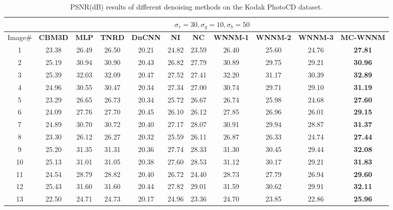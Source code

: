 \documentclass[10pt,onecolumn,letterpaper]{article}
\begin{document}
\begin{table}
\caption{PSNR(dB) results of different denoising methods on the Kodak PhotoCD dataset.}
\label{t2}
\begin{center}
\renewcommand\arraystretch{1.0}
\footnotesize
\begin{tabular}{|c||c|c|c|c|c|c|c|c|c|c|}
\hline
&\multicolumn{10}{c|}{ $\sigma_{r} = 30, \sigma_{g} = 10, \sigma_{b} = 50$}
\\
\hline
\hline
Image\#
&
\textbf{CBM3D} \cite{cbm3d}
&
\textbf{MLP} \cite{mlp}
&
\textbf{TNRD} \cite{chen2015learning}
&
\textbf{DnCNN} \cite{dncnn}
&
\textbf{NI} \cite{neatimage}
&
\textbf{NC} \cite{noiseclinic}
&
\textbf{WNNM-1} \cite{wnnm}
&
\textbf{WNNM-2}
&
\textbf{WNNM-3}
&
\textbf{MC-WNNM}
\\
\hline
1& 23.38 & 26.49 & 26.50 & 20.21 & 24.82 & 23.59 & 26.40 & 25.60 & 24.76 & \textbf{27.81}
\\
\hline
2& 25.19 & 30.94 & 30.90 & 20.43 & 26.82 & 27.79 & 30.89 & 29.75 & 29.21 & \textbf{30.96}
\\
\hline
3& 25.39 & 32.03 & 32.09 & 20.47 & 27.52 & 27.41 & 32.20 & 31.17 & 30.39 & \textbf{32.89}
\\
\hline 
4& 24.96 & 30.55 & 30.47 & 20.34 & 27.34 & 27.00 & 30.74 & 29.71 & 29.10 & \textbf{31.19} 
\\
\hline
5& 23.29 & 26.65 & 26.73 & 20.34 & 25.72 & 26.67 & 26.74 & 25.98 & 24.68 & \textbf{27.60}
\\
\hline
6& 24.09 & 27.76 & 27.70 & 20.45 & 26.10 & 26.12 & 27.85 & 26.96 & 26.01 & \textbf{29.15}
\\
\hline
7& 24.89 & 30.70 & 30.72 & 20.40 & 27.17 & 28.07 & 30.91 & 29.94 & 28.87 & \textbf{31.37} 
\\
\hline
8& 23.30 & 26.12 & 26.27 & 20.32 & 25.59 & 26.11 & 26.87 & 26.33 & 24.74 & \textbf{27.44}
\\
\hline
9& 25.20 & 31.35 & 31.31 & 20.36 & 27.74 & 28.33 & 31.30 & 30.45 & 29.44 & \textbf{32.08}
\\
\hline
10& 25.13 & 31.01 & 31.05 & 20.38 & 27.60 & 28.53 & 31.12 & 30.17 & 29.21 & \textbf{31.83}
\\
\hline
11& 24.54 & 28.79 & 28.82 & 20.40 & 26.72 & 24.40 & 28.73 & 27.79 & 26.94 & \textbf{29.60}
\\
\hline
12& 25.43 & 31.60 & 31.60 & 20.44 & 27.82 & 29.01 & 31.59 & 30.62 & 29.91 & \textbf{32.11}
\\
\hline
13& 22.50 & 24.71 & 24.73 & 20.17 & 24.96 & 23.36 & 24.70 & 23.85 & 22.86 & \textbf{25.96}
\\

\end{tabular}
\end{center}
\end{table}
\end{document}
